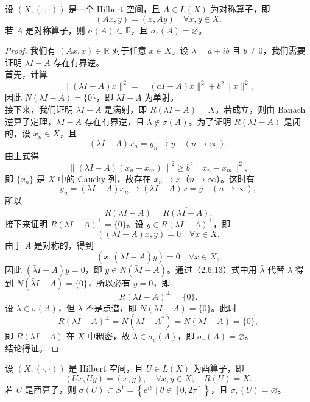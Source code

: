 \documentclass[lang=cn,newtx,10pt,scheme=chinese,thmcnt=chapter]{elegantbook}
\begin{document}
\begin{example}
设 \( (X, (\cdot, \cdot)) \) 是一个 Hilbert 空间，且 \( A \in L(X) \) 为对称算子，即
\[
(A x, y) = (x, A y) \quad \forall x, y \in X.
\]
若 \( A \) 是对称算子，则 \( \sigma(A) \subset \mathbb{R} \)，且 \( \sigma_r(A) = \varnothing \)。
\end{example}
\begin{proof}
我们有 \( (A x, x) \in \mathbb{R} \) 对于任意 \( x \in X \)。设 \( \lambda = a + ib \) 且 \( b \neq 0 \)，我们需要证明 \( \lambda I - A \) 存在有界逆。\\
首先，计算
\[
\|(\lambda I - A) x\|^2 = \|(a I - A) x\|^2 + b^2 \|x\|^2,
\]
因此 \( N(\lambda I - A) = \{0\} \)，即 \( \lambda I - A \) 为单射。\\
接下来，我们证明 \( \lambda I - A \) 是满射，即 \( R(\lambda I - A) = X \)。若成立，则由 Banach 逆算子定理，\( \lambda I - A \) 存在有界逆，且 \( \lambda \notin \sigma(A) \)。为了证明 \( R(\lambda I - A) \) 是闭的，设 \( x_n \in X \)，且
\[
(\lambda I - A) x_n = y_n \to y \quad (n \to \infty).
\]
由上式得
\[
\left\|(\lambda I - A)(x_n - x_m)\right\|^2 \geqslant b^2 \|x_n - x_m\|^2,
\]
即 \( \{x_n\} \) 是 \( X \) 中的 Cauchy 列，故存在 \( x_n \to x \)（\( n \to \infty \)）。这时有
\[
y_n = (\lambda I - A) x_n \to (\lambda I - A) x = y \quad (n \to \infty),
\]
所以
\[
R(\lambda I - A) = \overline{R(\lambda I - A)}.
\]
接下来证明 \( R(\lambda I - A)^\perp = \{0\} \)。设 \( y \in R(\lambda I - A)^\perp \)，即
\[
((\lambda I - A) x, y) = 0 \quad \forall x \in X.
\]
由于 \( A \) 是对称的，得到
\[
(x, (\bar{\lambda} I - A) y) = 0 \quad \forall x \in X,
\]
因此 \( (\bar{\lambda} I - A) y = 0 \)，即 \( y \in N(\bar{\lambda} I - A) \)。通过（2.6.13）式中用 \( \bar{\lambda} \) 代替 \( \lambda \) 得到 \( N(\bar{\lambda} I - A) = \{0\} \)，所以必有 \( y = 0 \)，即
\[
R(\lambda I - A)^\perp = \{0\}.
\]
设 \( \lambda \in \sigma(A) \)，但 \( \lambda \) 不是点谱，即 \( N(\lambda I - A) = \{0\} \)。此时
\[
R(\lambda I - A)^\perp = N(\bar{\lambda} I - A^*) = N(\lambda I - A) = \{0\},
\]
即 \( R(\lambda I - A) \) 在 \( X \) 中稠密，故 \( \lambda \in \sigma_c(A) \)，即 \( \sigma_r(A) = \varnothing \)。\\
结论得证。
\end{proof}
\begin{example}
设 \( (X, (\cdot, \cdot)) \) 是 Hilbert 空间，且 \( U \in L(X) \) 为酉算子，即
\[
(U x, U y) = (x, y), \quad \forall x, y \in X, \quad R(U) = X.
\]
若 \( U \) 是酉算子，则 \( \sigma(U) \subset S^1 = \left\{ e^{i\theta} \mid \theta \in [0, 2\pi] \right\} \)，且 \( \sigma_r(U) = \varnothing \)。


\end{example}
\end{document}
